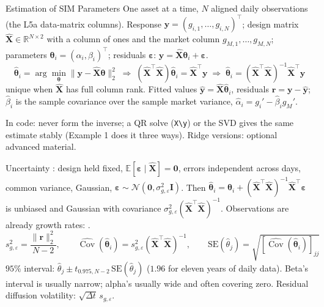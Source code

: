 \documentclass[aspectratio=169,11pt]{beamer}
\newcommand{\E}{\mathbb{E}}
\newcommand{\Cov}{\operatorname{Cov}}
\newcommand{\beps}{\boldsymbol{\varepsilon}}
\newcommand{\bX}{\hat{\mathbf{X}}}
\newcommand{\by}{\mathbf{y}}
\newcommand{\bth}{\boldsymbol{\theta}}
\begin{document}
\begin{frame}{Estimation of SIM Parameters}
  One asset at a time, $N$ aligned daily observations (the L5a data-matrix
  columns). Response $\by=(g_{i,1},\ldots,g_{i,N})^{\top}$; design matrix
  $\bX\in\mathbb R^{N\times2}$ with a column of ones and the market column
  $g_{M,1},\ldots,g_{M,N}$; parameters $\bth_i=(\alpha_i,\beta_i)^{\top}$;
  residuals $\beps$: $\by=\bX\bth_i+\beps$.
  \[
    \boxed{\hat{\bth}_i=\arg\min_{\bth}\lVert\by-\bX\bth\rVert_2^2
      \;\Longrightarrow\;
      (\bX^{\top}\bX)\hat{\bth}_i=\bX^{\top}\by
      \;\Longrightarrow\;
      \hat{\bth}_i=(\bX^{\top}\bX)^{-1}\bX^{\top}\by}
  \]
  unique when $\bX$ has full column rank. Fitted values $\hat{\by}=\bX\hat{\bth}_i$,
  residuals $\mathbf r=\by-\hat{\by}$; $\hat\beta_i$ is the sample covariance
  over the sample market variance, $\hat\alpha_i=g_i'-\hat\beta_ig_M'$.

  \vspace{0.3em}
  In code: never form the inverse; a QR solve (\texttt{X\textbackslash y}) or the
  SVD gives the same estimate stably (Example 1 does it three ways). Ridge
  versions: optional advanced material.
\end{frame}

\begin{frame}{Uncertainty}
  : design held fixed, $\E[\beps\mid\bX]=\mathbf 0$,
  errors independent across days, common variance, Gaussian,
  $\beps\sim\mathcal N(\mathbf 0,\sigma^2_{g,\varepsilon}\mathbf I)$. Then
  $\hat{\bth}_i=\bth_i+(\bX^{\top}\bX)^{-1}\bX^{\top}\beps$ is unbiased and
  Gaussian with covariance $\sigma^2_{g,\varepsilon}(\bX^{\top}\bX)^{-1}$.
  Observations are already growth rates: .
  \[
    \boxed{s^2_{g,\varepsilon}=\frac{\lVert\mathbf r\rVert_2^2}{N-2},\qquad
      \widehat{\Cov}(\hat{\bth}_i)=s^2_{g,\varepsilon}(\bX^{\top}\bX)^{-1},\qquad
      \mathrm{SE}(\hat\theta_j)=\sqrt{[\widehat{\Cov}(\hat{\bth}_i)]_{jj}}}
  \]
  $95\%$ interval: $\hat\theta_j\pm t_{0.975,N-2}\,\mathrm{SE}(\hat\theta_j)$
  ($1.96$ for eleven years of daily data). Beta's interval is usually narrow;
  alpha's usually wide and often covering zero. Residual diffusion volatility:
  $\sqrt{\Delta t}\,s_{g,\varepsilon}$.
\end{frame}
\end{document}
